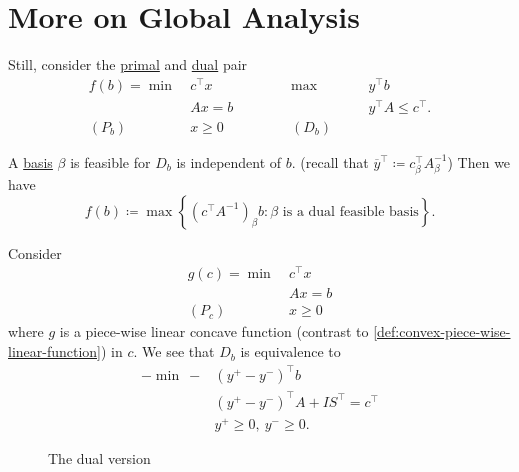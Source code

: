 \section{More on Global Analysis}
Still, consider the \hyperref[def:primal]{primal} and \hyperref[def:dual]{dual} pair
\[
	\begin{alignedat}{5}
		f(b) = \min~&c^{\top}x\qquad\qquad&&\max ~&&y^{\top}b\\
		&Ax = b 				&&		&&y^{\top}A\leq c^{\top}.\\
		(P_b)\quad	&x\geq  0 	&&(D_b)\quad&&
	\end{alignedat}
\]

A \hyperref[def:basic]{basis} \(\beta\) is feasible for \(D_b\) is independent of \(b\). (recall that \(\overline{y}^{\top}\coloneqq c_{\beta}^{\top}A^{-1}_{\beta}\)) Then we have
\[
	f(b)\coloneqq \max\left\{ (c^{\top}A^{-1})_{\beta}b \colon \beta \text{ is a dual feasible basis} \right\} .
\]

Consider
\begin{align*}
	g(c)=\min~ & c^{\top}x \\
	           & Ax = b    \\
	(P_c)\quad & x\geq 0
\end{align*}
where \(g\) is a piece-wise linear concave function (contrast to \autoref{def:convex-piece-wise-linear-function}) in \(c\). We see that \(D_b\) is equivalence to
\begin{align*}
	-\min~  - & (y^+ - y^-)^{\top}b                         \\
	          & (y^+ - y^-)^{\top}A + I S^{\top} = c^{\top} \\
	          & y^+\geq 0,\ y^- \geq 0.
\end{align*}

\begin{figure}[H]
	\centering
	\caption{The dual version}
	\label{fig:local-analysis-dual}
\end{figure}
